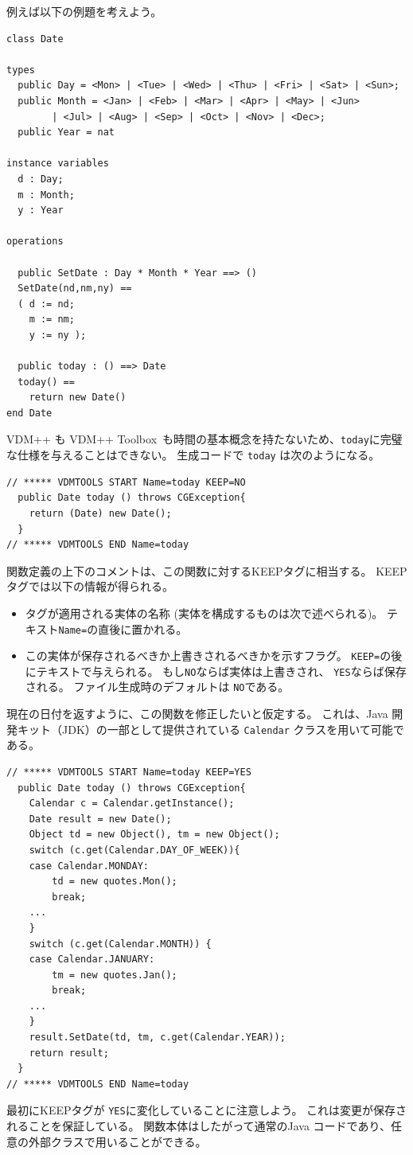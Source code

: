\documentclass[\pformat,11pt]{jarticle}
\newcommand{\ToolboxName}{VDM++ Toolbox}
\begin{document}
例えば以下の例題を考えよう。
\begin{screen}
\begin{verbatim}
class Date

types
  public Day = <Mon> | <Tue> | <Wed> | <Thu> | <Fri> | <Sat> | <Sun>;
  public Month = <Jan> | <Feb> | <Mar> | <Apr> | <May> | <Jun> 
        | <Jul> | <Aug> | <Sep> | <Oct> | <Nov> | <Dec>;
  public Year = nat

instance variables
  d : Day;
  m : Month;
  y : Year

operations

  public SetDate : Day * Month * Year ==> ()
  SetDate(nd,nm,ny) ==
  ( d := nd;
    m := nm;
    y := ny );

  public today : () ==> Date
  today() ==
    return new Date()
end Date
\end{verbatim}
\end{screen}
 VDM++ も \ToolboxName\ も時間の基本概念を持たないため、\texttt{today}に完璧な仕様を与えることはできない。 
生成コードで \texttt{today} は次のようになる。
\begin{screen}
\begin{verbatim}
// ***** VDMTOOLS START Name=today KEEP=NO
  public Date today () throws CGException{
    return (Date) new Date();
  }
// ***** VDMTOOLS END Name=today
\end{verbatim}
\end{screen}
関数定義の上下のコメントは、この関数に対するKEEPタグに相当する。
KEEPタグでは以下の情報が得られる。
\begin{itemize}
\item タグが適用される実体の名称 (実体を構成するものは次で述べられる)。
 テキスト\texttt{Name=}の直後に置かれる。
\item この実体が保存されるべきか上書きされるべきかを示すフラグ。 
 \texttt{KEEP=}の後にテキストで与えられる。
もし\texttt{NO}ならば実体は上書きされ、 \texttt{YES}ならば保存される。
ファイル生成時のデフォルトは \texttt{NO}である。
\end{itemize}
現在の日付を返すように、この関数を修正したいと仮定する。
これは、Java 開発キット（JDK）の一部として提供されている \texttt{Calendar} クラスを用いて可能である。
\begin{screen}
\begin{verbatim}
// ***** VDMTOOLS START Name=today KEEP=YES
  public Date today () throws CGException{
    Calendar c = Calendar.getInstance();
    Date result = new Date();
    Object td = new Object(), tm = new Object();
    switch (c.get(Calendar.DAY_OF_WEEK)){
    case Calendar.MONDAY:
        td = new quotes.Mon();
        break;
    ...
    }
    switch (c.get(Calendar.MONTH)) {
    case Calendar.JANUARY:
        tm = new quotes.Jan();
        break;
    ...
    }
    result.SetDate(td, tm, c.get(Calendar.YEAR));
    return result;
  }
// ***** VDMTOOLS END Name=today
\end{verbatim}
\end{screen}
最初にKEEPタグが \texttt{YES}に変化していることに注意しよう。
これは変更が保存されることを保証している。
関数本体はしたがって通常のJava コードであり、任意の外部クラスで用いることができる。
\end{document}
